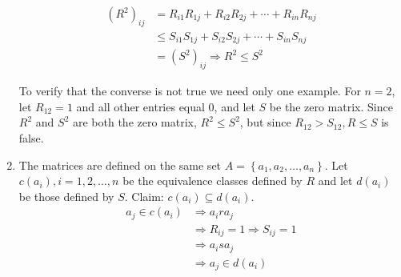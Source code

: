 \documentclass[10pt,]{book}
\theoremstyle{plain}
\theoremstyle{definition}
\theoremstyle{definition}
\theoremstyle{definition}
\theoremstyle{definition}
\begin{document}
\begin{exercisegroup}
\begin{enumerate}[label=\alph*]
\begin{equation*}
\begin{split}
 \left(R^2\right)_{ij}&=R_{i1}R_{1j}+R_{i2}R_{2j}+\cdots +R_{in}R_{nj}\\
       &\leq S_{i1}S_{1j}+S_{i2}S_{2j}+\cdots +S_{in}S_{nj}\\
       &=\left(S^2\right)_{ij} \Rightarrow R^2\leq S^2
\end{split}
\end{equation*}%
\par
To verify that the converse is not true we need only one example. For \(n=2\), let \(R_{12}=1\) and all other entries equal \(0\), and let \(S\) be the zero matrix. Since \(R^2\) and \(S^2\) are both the zero matrix, \(R^2\leq S^2\), but since \(R_{12}>S_{12}, R\leq S\) is false.%
\item\hypertarget{li-117}{} The matrices are defined on the same set \(A=\left\{a_1,a_2,\ldots  ,a_n\right\}\). Let \(c\left(a_i\right), i=1,2,\ldots  ,n\) be the equivalence classes defined by \(R\) and let \(d\left(a_i\right)\) be those defined by \(S\). Claim: \(c\left(a_i\right)\subseteq d\left(a_i\right)\). 
	\begin{equation*}\begin{split}
	 a_j\in c\left(a_i\right)&\Rightarrow a_i r a_j\\
	 		&\Rightarrow R_{ij}=1 \Rightarrow S_{ij}=1\\
	 		&\Rightarrow a_i s a_j\\ 
	 		& \Rightarrow a_j \in d\left(a_i\right)\\
	 		\end{split}
	 \end{equation*}%
\end{enumerate}
%
\end{exercisegroup}
\par\smallskip\noindent
\typeout{************************************************}
\typeout{************************************************}
\end{document}
